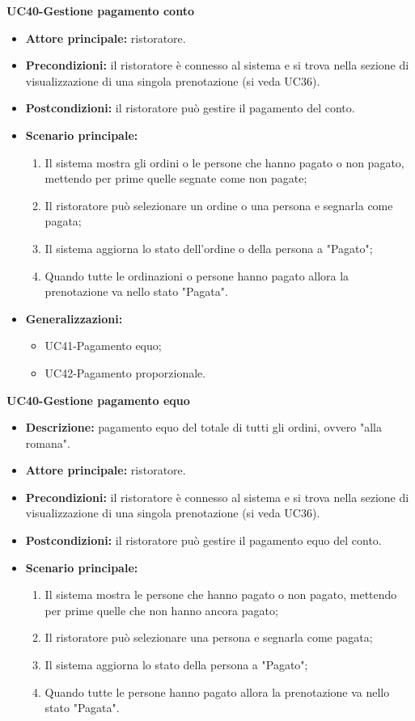 
\textbf{UC40-Gestione pagamento conto}  
\begin{itemize}
    \item \textbf{Attore principale:} ristoratore.
    \item \textbf{Precondizioni:} il ristoratore è connesso al sistema e si trova nella sezione di visualizzazione di una singola prenotazione (si veda UC36).
    \item \textbf{Postcondizioni:} il ristoratore può gestire il pagamento del conto.
    \item \textbf{Scenario principale:}
    \begin{enumerate}
        \item Il sistema mostra gli ordini o le persone che hanno pagato o non pagato, mettendo per prime quelle segnate come non pagate;
        \item Il ristoratore può selezionare un ordine o una persona e segnarla come pagata;
        \item Il sistema aggiorna lo stato dell'ordine o della persona a "Pagato";
        \item Quando tutte le ordinazioni o persone hanno pagato allora la prenotazione va nello stato "Pagata".
    \end{enumerate}
    \item \textbf{Generalizzazioni:}
        \begin{itemize}
            \item UC41-Pagamento equo;
            \item UC42-Pagamento proporzionale.
        \end{itemize}
\end{itemize}

\textbf{UC40-Gestione pagamento equo}  
\begin{itemize}
    \item \textbf{Descrizione:} pagamento equo del totale di tutti gli ordini, ovvero "alla romana".
    \item \textbf{Attore principale:} ristoratore.
    \item \textbf{Precondizioni:} il ristoratore è connesso al sistema e si trova nella sezione di visualizzazione di una singola prenotazione (si veda UC36).
    \item \textbf{Postcondizioni:} il ristoratore può gestire il pagamento equo del conto.
    \item \textbf{Scenario principale:}
    \begin{enumerate}
        \item Il sistema mostra le persone che hanno pagato o non pagato, mettendo per prime quelle che non hanno ancora pagato;
        \item Il ristoratore può selezionare una persona e segnarla come pagata;
        \item Il sistema aggiorna lo stato della persona a "Pagato";
        \item Quando tutte le persone hanno pagato allora la prenotazione va nello stato "Pagata".
    \end{enumerate}
\end{itemize}


